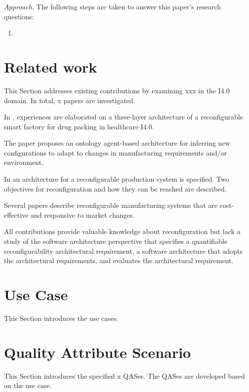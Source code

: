 \documentclass[conference]{IEEEtran}
\begin{document}
\emph{Approach.}
The following steps are taken to answer this paper's research questions: 
\begin{enumerate}
    \item 
\end{enumerate}


\section{Related work}
\label{sec:related_work}
This Section addresses existing contributions by examining xxx in the I4.0 domain. 
In total, x papers are investigated. 

In \cite{Wan2019Reconfigurable}, experiences are elaborated on a three-layer architecture of a reconfigurable smart factory for drug packing in healthcare I4.0. 

The paper \cite{Yazen2010Ontology} proposes an ontology agent-based architecture for inferring  new configurations to adapt to changes in manufacturing requirements and/or environment.

In \cite{Leitao2016Specification,Angione2017Integration} an architecture for a reconfigurable production system is specified.
Two objectives for reconfiguration and how they can be reached are described.

Several papers \cite{Koren1999Reconfigurable,Koren2010Design,Bortolini2018Reconfigurable} describe reconfigurable manufacturing systems that are cost-effective and responsive to market changes.

All contributions provide valuable knowledge about reconfiguration but lack a study of the software architecture perspective that specifies a quantifiable reconfigurability architectural requirement, a software architecture that adopts the architectural requirements, and evaluates the architectural requirement. 


\section{Use Case}
\label{sec:use_case}
This Section introduces the use cases.

\section{Quality Attribute Scenario}
\label{sec:qas}
This Section introduces the specified x QASes.
The QASes are developed based on the use case.

\end{document}
